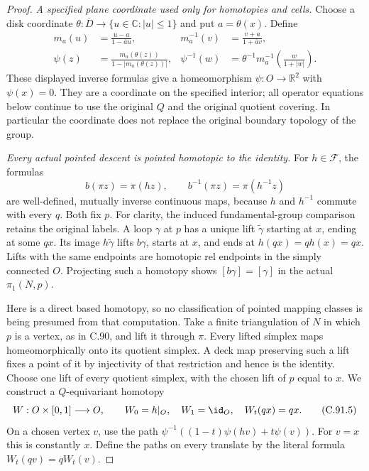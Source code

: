 \begin{proof}
\emph{A specified plane coordinate used only for homotopies and cells.}
Choose a disk coordinate
$\theta:\overline D\to\{u\in\mathbb C:|u|\leq1\}$ and put
$a=\theta(x)$.  Define
\[
 \begin{aligned}
 m_a(u)&=\frac{u-a}{1-\overline a u},
       &m_a^{-1}(v)&=\frac{v+a}{1+\overline a v},\\
 \psi(z)&=\frac{m_a(\theta(z))}{1-|m_a(\theta(z))|},
       &\psi^{-1}(w)&=
          \theta^{-1}m_a^{-1}\!\left(\frac{w}{1+|w|}\right).
 \end{aligned}                                                    \tag{C.91.3}
\]
These displayed inverse formulas give a homeomorphism
$\psi:O\to\mathbb R^2$ with $\psi(x)=0$.
They are a coordinate on the specified interior; all operator
equations below continue to use the original $Q$ and the
original quotient covering.  In particular the coordinate
does not replace the original boundary topology of the group.

\emph{Every actual pointed descent is pointed homotopic to the identity.}
For $h\in\mathscr F$, the formulas
\[
             b(\pi z)=\pi(hz),\qquad
             b^{-1}(\pi z)=\pi(h^{-1}z)                         \tag{C.91.4}
\]
are well-defined, mutually inverse continuous maps, because
$h$ and $h^{-1}$ commute with every $q$.  Both fix $p$.
For clarity, the induced fundamental-group comparison retains
the original labels.  A loop $\gamma$ at $p$ has a unique lift
$\widetilde\gamma$ starting at $x$, ending at some $qx$.
Its image $h\widetilde\gamma$ lifts $b\gamma$, starts at $x$,
and ends at $h(qx)=qh(x)=qx$.  Lifts with the same endpoints
are homotopic rel endpoints in the simply connected $O$.
Projecting such a homotopy shows
$[b\gamma]=[\gamma]$ in the actual $\pi_1(N,p)$.

Here is a direct based homotopy, so no classification of
pointed mapping classes is being presumed from that computation.
Take a finite triangulation of $N$ in which $p$ is a vertex,
as in C.90, and lift it through $\pi$.
Every lifted simplex maps homeomorphically onto its quotient
simplex.  A deck map preserving such a lift fixes a point
of it by injectivity of that restriction and hence is the
identity.  Choose one lift of every quotient simplex,
with the chosen lift of $p$ equal to $x$.
We construct a $Q$-equivariant homotopy
\[
 W:O\times[0,1]\longrightarrow O,
 \qquad W_0=h|_O,\quad W_1=\id_O,\quad W_t(qx)=qx.            \tag{C.91.5}
\]
On a chosen vertex $v$, use the path
$\psi^{-1}((1-t)\psi(hv)+t\psi(v))$.
For $v=x$ this is constantly $x$.
Define the paths on every translate by the literal formula
$W_t(qv)=qW_t(v)$.


\end{proof}
